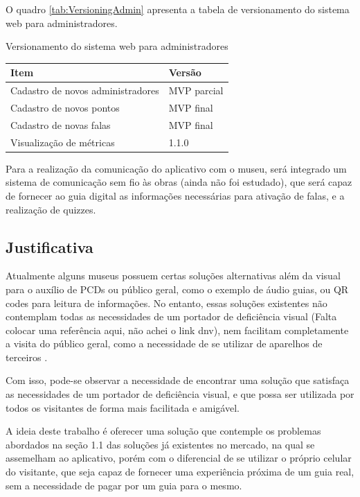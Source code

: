 O quadro \ref{tab:VersioningAdmin} apresenta a tabela de versionamento do sistema web para administradores.

\renewcommand{\arraystretch}{1}
\begin{quadro}[H]
    \centering
    \caption{Versionamento do sistema web para administradores}
    \begin{tabular}{|m{}|m{}|}
        \hline
        \rowcolor[HTML]{C0C0C0}
        \textbf{Item} & \textbf{Versão} \\
        \hline
        Cadastro de novos administradores & MVP parcial \\
        \hline
        Cadastro de novos pontos & MVP final \\
        \hline
        Cadastro de novas falas & MVP final \\
        \hline
        Visualização de métricas & 1.1.0 \\
        \hline
    \end{tabular}
    \vspace{-0.6cm}
    \label{tab:VersioningAdmin}
\end{quadro}
\renewcommand{\arraystretch}{1.1}

Para a realização da comunicação do aplicativo com o museu, será integrado um sistema de comunicação sem fio às obras (ainda não foi estudado), que será capaz de fornecer ao guia digital as informações necessárias para ativação de falas, e a realização de quizzes.

\subsection{Justificativa}

Atualmente alguns museus possuem certas soluções alternativas além da visual para o auxílio de PCDs ou público geral, como o exemplo de áudio guias, ou QR codes para leitura de informações. No entanto, essas soluções existentes não contemplam todas as necessidades de um portador de deficiência visual (Falta colocar uma referência aqui, não achei o link dnv), nem facilitam completamente a visita do público geral, como a necessidade de se utilizar de aparelhos de terceiros \cite{Nintendo:Louvre}.

Com isso, pode-se observar a necessidade de encontrar uma solução que satisfaça as necessidades de um portador de deficiência visual, e que possa ser utilizada por todos os visitantes de forma mais facilitada e amigável. 

A ideia deste trabalho é oferecer uma solução que contemple os problemas abordados na seção 1.1 das soluções já existentes no mercado, na qual se assemelham ao aplicativo, porém com o diferencial de se utilizar o próprio celular do visitante, que seja capaz de fornecer uma experiência próxima de um guia real, sem a necessidade de pagar por um guia para o mesmo.

